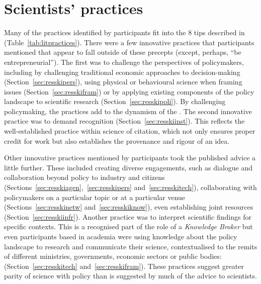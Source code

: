 \section{Scientists' practices}\label{sec:disstrategies}

Many of the practices identified by participants fit into the 8 tips described in \textcite{OliverC2019} (Table~\ref{tab:litpractices}). There were a few innovative practices that participants mentioned that appear to fall outside of these precepts (except, perhaps, ``be entrepreneurial''). The first was to challenge the perspectives of policymakers, including by challenging traditional economic approaches to decision-making (Section~\ref{sec:resskipers}), using physical or behavioural science when framing issues (Section~\ref{sec:resskifram}) or by applying existing components of the policy landscape to scientific research (Section~\ref{sec:resskipoli}). By challenging policymaking, the practices add to the dynamism of the \SPI. The second innovative practice was to demand recognition (Section~\ref{sec:resskiinst}). This reflects the well-established practice within science of citation, which not only ensures proper credit for work but also establishes the provenance and rigour of an idea.

Other innovative practices mentioned by participants took the published advice a little further. These included creating diverse engagements, such as dialogue and collaboration beyond policy to industry and citizens (Sections~\ref{sec:resskiagen},~\ref{sec:resskipers} and~\ref{sec:resskitech}), collaborating with policymakers on a particular topic or at a particular venue (Sections~\ref{sec:resskinetw} and~\ref{sec:resskiknow}), even establishing joint resources (Section~\ref{sec:resskiinfr}). Another practice was to interpret scientific findings for specific contexts. This is a recognised part of the role of a \emph{Knowledge Broker} but even participants based in academia were using knowledge about the policy landscape to research and communicate their science, contextualised to the remits of different ministries, governments, economic sectors or public bodies:  (Section~\ref{sec:resskitech} and~\ref{sec:resskifram}). These practices suggest greater parity of science with policy than is suggested by much of the advice to scientists. 

